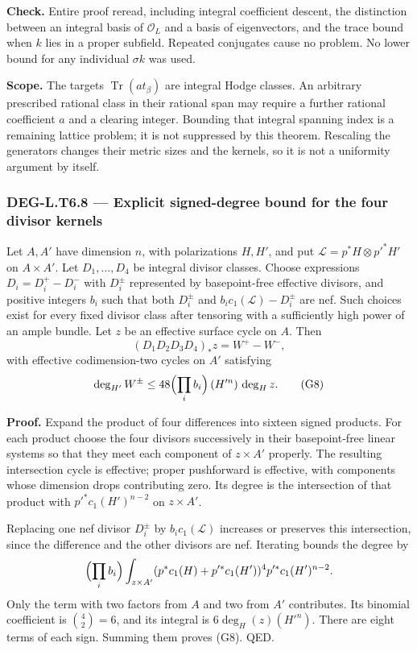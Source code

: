 \documentclass[11pt,a4paper]{article}
\theoremstyle{definition}
\begin{document}
\textbf{Check.} Entire proof reread, including integral coefficient descent, the distinction between an integral basis of \(\mathcal O_L\) and a basis of eigenvectors, and the trace bound when \(k\) lies in a proper subfield. Repeated conjugates cause no problem. No lower bound for any individual \(\sigma k\) was used.

\textbf{Scope.} The targets \(\operatorname{Tr}(a t_\beta)\) are integral Hodge classes. An arbitrary prescribed rational class in their rational span may require a further rational coefficient \(a\) and a clearing integer. Bounding that integral spanning index is a remaining lattice problem; it is not suppressed by this theorem. Rescaling the generators changes their metric sizes and the kernels, so it is not a uniformity argument by itself.

\subsubsection{DEG-L.T6.8 --- Explicit signed-degree bound for the four divisor kernels}\label{DEG-L.T6.8}

Let \(A,A'\) have dimension \(n\), with polarizations \(H,H'\), and put \(\mathscr L=p^*H\otimes p'^*H'\) on \(A\times A'\). Let \(D_1,\ldots,D_4\) be integral divisor classes. Choose expressions \(D_i=D_i^+-D_i^-\) with \(D_i^\pm\) represented by basepoint-free effective divisors, and positive integers \(b_i\) such that both \(D_i^\pm\) and \(b_i c_1(\mathscr L)-D_i^\pm\) are nef. Such choices exist for every fixed divisor class after tensoring with a sufficiently high power of an ample bundle. Let \(z\) be an effective surface cycle on \(A\). Then \[
(D_1D_2D_3D_4)_*z=W^+-W^-,
\] with effective codimension-two cycles on \(A'\) satisfying \[
\deg_{H'}W^\pm\le48\Bigl(\prod_i b_i\Bigr)\,(H'^n)\,\deg_H z.
\tag{G8}
\]

\textbf{Proof.} Expand the product of four differences into sixteen signed products. For each product choose the four divisors successively in their basepoint-free linear systems so that they meet each component of \(z\times A'\) properly. The resulting intersection cycle is effective; proper pushforward is effective, with components whose dimension drops contributing zero. Its degree is the intersection of that product with \(p'^*c_1(H')^{n-2}\) on \(z\times A'\).

Replacing one nef divisor \(D_i^\pm\) by \(b_i c_1(\mathscr L)\) increases or preserves this intersection, since the difference and the other divisors are nef. Iterating bounds the degree by \[
\Bigl(\prod_i b_i\Bigr)
\int_{z\times A'}(p^*c_1(H)+p'^*c_1(H'))^4p'^*c_1(H')^{n-2}.
\] Only the term with two factors from \(A\) and two from \(A'\) contributes. Its binomial coefficient is \(\binom42=6\), and its integral is \(6\deg_H(z)(H'^n)\). There are eight terms of each sign. Summing them proves (G8). QED.
\end{document}
